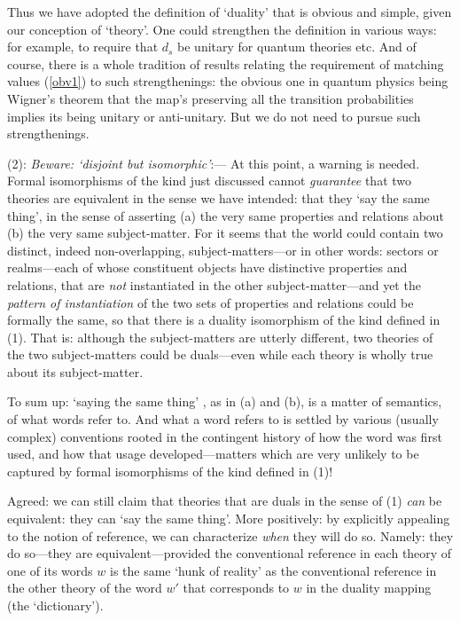 \documentclass[12pt]{article}
\renewcommand{\^}[1]{\hat{#1}}
\newcommand{\eq}[1]{(\ref{#1})}
\begin{document}
Thus we have adopted the definition of `duality' that is obvious and simple, given our conception of `theory'. One  could strengthen the definition in various ways: for example, to require that $d_s$ be unitary for quantum theories etc.  And of course, there is a whole tradition of results relating the requirement of matching values \eq{obv1} to such strengthenings: the obvious one in quantum physics being Wigner's theorem that the map's preserving all the transition probabilities implies its being  unitary or anti-unitary. But we do not need to pursue such strengthenings. 


(2): {\em Beware: `disjoint but isomorphic'}:--- At this point, a warning is needed. Formal isomorphisms of the kind just discussed cannot {\em guarantee} that two theories are equivalent in the sense we have intended: that they `say the same thing', in the sense of asserting (a) the very same properties and relations about (b) the very same subject-matter.  For it seems that the world could contain two distinct, indeed non-overlapping, subject-matters---or in other words: sectors or realms---each of whose constituent objects have distinctive properties and relations, that are {\em not} instantiated in the other subject-matter---and yet the {\em pattern of instantiation} of the two sets of properties and relations could be formally the same, so that there is a duality isomorphism of the kind defined in (1). That is: although the subject-matters are utterly different,  two theories of the two subject-matters could  be duals---even while each theory is wholly true about its subject-matter. 

To sum up: `saying the same thing' , as in (a) and (b), is a matter of semantics, of what words refer to. And what a word refers to is settled by various (usually complex) conventions rooted in the contingent history of how the word was first used, and how that usage developed---matters which are very unlikely to be captured by formal isomorphisms of the kind defined in (1)! 

Agreed:  we can still claim that theories that are duals in the sense of (1) {\em can} be equivalent: they can `say the same thing'. More positively: by explicitly appealing to the notion of reference, we can characterize {\em when} they will do so. Namely: they do so---they are equivalent---provided the conventional reference in each theory of one of its words $w$ is the same `hunk of reality' as the conventional reference in the other theory of the word $w'$ that corresponds to $w$ in the duality mapping (the `dictionary'). 
\end{document}
